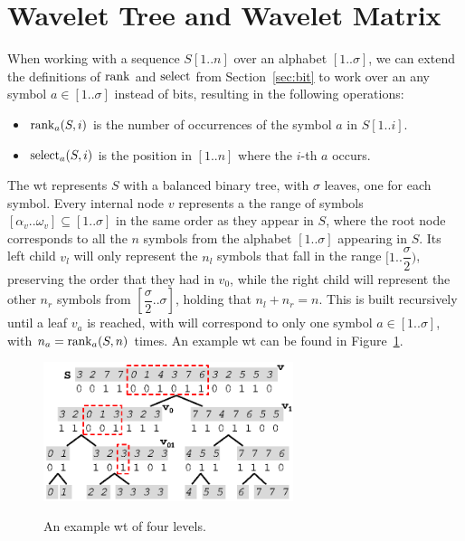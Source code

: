 \documentclass[a4paper,10pt,twoside]{book}
\begin{document}
	\section{Wavelet Tree and Wavelet Matrix}
	\label{sec:wt}
	When working with a sequence $S[1..n]$ over an alphabet $[1..\sigma]$, we can extend the definitions of $\operatorname{rank}$ and $\operatorname{select}$ from Section~\ref{sec:bit} to work over an any symbol $a \in [1..\sigma]$ instead of bits, resulting in the following operations:
	
	\begin{itemize}
	    \item $\operatorname{rank}_a(S,i)$ is the number of occurrences of the symbol $a$ in $S[1..i]$.
	    \item $\operatorname{select}_a(S,i)$ is the position in $[1..n]$ where the $i$-th $a$ occurs.
	\end{itemize}
	
    The \gls{wt} \cite{WT03} represents $S$ with a balanced binary tree, with $\sigma$ leaves, one for each symbol. Every internal node $v$ represents a the range of symbols $[\alpha_v..\omega_v] \subseteq [1..\sigma]$ in the same order as they appear in $S$, where the root node corresponds to all the $n$ symbols from the alphabet $[1..\sigma]$ appearing in $S$. Its left child $v_l$ will only represent the $n_l$ symbols that fall in the range $[1..\dfrac{\sigma}{2})$, preserving the order that they had in $v_0$, while the right child will represent the other $n_r$ symbols from $[\dfrac{\sigma}{2}..\sigma]$, holding that $n_l+n_r=n$. This is built recursively until a leaf $v_a$ is reached, with will correspond to only one symbol $a \in [1..\sigma]$, with $n_a = \operatorname{rank}_a(S,n)$ times. An example \gls{wt} can be found in Figure~\ref{fig:wt}.
    
    \begin{figure}[ht]
		\begin{center}
			{\includegraphics[width=0.65\textwidth]{figures/wt1.eps}}
		\end{center}
		\caption{An example \acrlong{wt} of four levels.}
		\label{fig:wt}
	\end{figure}
    
\end{document}
